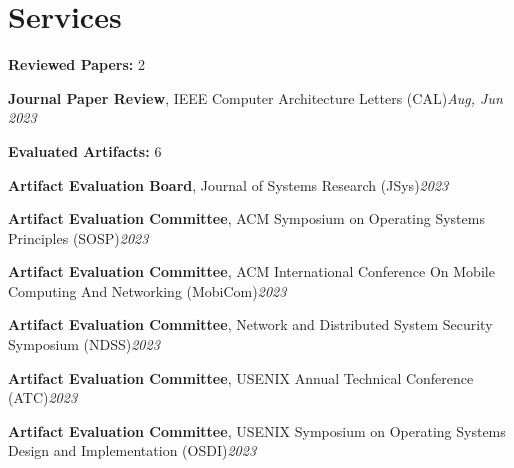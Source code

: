 \documentclass[letterpaper,11pt]{article}
\makeatletter
\newcommand{\resumeItem}[1]{
  \item\small{
    {#1 \vspace{-2pt}}
  }
}
\newcommand{\resumeProjectHeading}[2]{
    \vspace{-2pt}\item
    \begin{tabular*}{0.97\textwidth}{l@{\extracolsep{\fill}}r}
      \small#1 & #2 \\
    \end{tabular*}\vspace{-7pt}
}
\newcommand{\resumeSubHeadingListStart}{\begin{itemize}[leftmargin=0.15in, label={}]}
\newcommand{\resumeSubHeadingListEnd}{\end{itemize}}
\newcommand{\resumeItemListStart}{\begin{itemize}}
\newcommand{\resumeItemListEnd}{\end{itemize}\vspace{-5pt}}
\makeatother
\begin{document}
      

\section{Services}
  \vspace{2pt}
  \resumeSubHeadingListStart
    \small{\item{
        \textbf{\large Reviewed Papers:} {\large 2}\hfill \\ \vspace{3pt}
    
        \textbf{Journal Paper Review}, IEEE Computer Architecture Letters (CAL)\hfill \textit{Aug, Jun 2023} \\ \vspace{5pt}

        \textbf{\large Evaluated Artifacts:} {\large 6}\hfill \\ \vspace{3pt}

        \textbf{Artifact Evaluation Board}, Journal of Systems Research (JSys)\hfill \textit{2023} \\ \vspace{3pt}

        \textbf{Artifact Evaluation Committee}, ACM Symposium on Operating Systems Principles (SOSP)\hfill \textit{2023} \\ \vspace{3pt}

        \textbf{Artifact Evaluation Committee}, ACM International Conference On Mobile Computing And Networking (MobiCom)\hfill \textit{2023} \\ \vspace{3pt}

        \textbf{Artifact Evaluation Committee}, Network and Distributed System Security Symposium (NDSS)\hfill \textit{2023} \\ \vspace{3pt}
    
        \textbf{Artifact Evaluation Committee}, USENIX Annual Technical Conference (ATC)\hfill \textit{2023} \\ \vspace{3pt}
        
        \textbf{Artifact Evaluation Committee}, USENIX Symposium on Operating Systems Design and Implementation (OSDI)\hfill \textit{2023} \\ \vspace{3pt}
    }}
  \resumeSubHeadingListEnd
\end{document}
